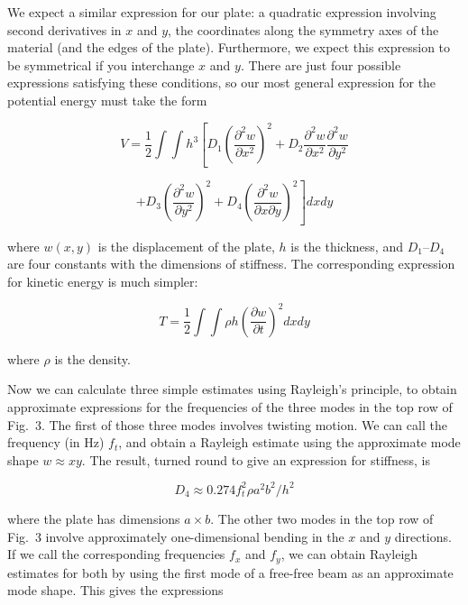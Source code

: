   We expect a similar expression for our plate: a quadratic expression 
  involving second derivatives in $x$ and $y$, the coordinates along the 
  symmetry axes of the material (and the edges of the plate). Furthermore, we 
  expect this expression to be symmetrical if you interchange $x$ and $y$. 
  There are just four possible expressions satisfying these conditions, so our 
  most general expression for the potential energy must take the form 

  \begin{equation*} V = \dfrac{1}{2} \int{\int{h^3 \left[ D_1 
  \left(\dfrac{\partial^2 w}{\partial x^2} \right)^2 + D_2 \dfrac{\partial^2 
  w}{\partial x^2} \dfrac{\partial^2 w}{\partial y^2} \right. }} 
  \end{equation*} 

  \begin{equation*} \left. + D_3 \left(\dfrac{\partial^2 w}{\partial y^2} 
  \right)^2 + D_4 \left(\dfrac{\partial^2 w}{\partial x \partial y} \right)^2 
  \right] dx dy \tag{1}\end{equation*} 

  \noindent{}where $w(x,y)$ is the displacement of the plate, $h$ is the 
  thickness, and $D_1$--$D_4$ are four constants with the dimensions of 
  stiffness. The corresponding expression for kinetic energy is much simpler: 

  \begin{equation*}T=\dfrac{1}{2} \int{\int{ \rho h \left( \dfrac{\partial 
  w}{\partial t} \right)^2 dx dy }} \tag{2}\end{equation*} 

  \noindent{}where $\rho$ is the density. 

  Now we can calculate three simple estimates using Rayleigh's principle, to 
  obtain approximate expressions for the frequencies of the three modes in the 
  top row of Fig.\ 3. The first of those three modes involves twisting motion. 
  We can call the frequency (in Hz) $f_t$, and obtain a Rayleigh estimate using 
  the approximate mode shape $w \approx xy .$ The result, turned round to give 
  an expression for stiffness, is 

  \begin{equation*}D_4 \approx 0.274 f_t^2 \rho a^2 b^2/h^2 
  \tag{3}\end{equation*} 

  \noindent{}where the plate has dimensions $a \times b$. The other two modes 
  in the top row of Fig.\ 3 involve approximately one-dimensional bending in 
  the $x$ and $y$ directions. If we call the corresponding frequencies $f_x$ 
  and $f_y$, we can obtain Rayleigh estimates for both by using the first mode 
  of a free-free beam as an approximate mode shape. This gives the expressions 

